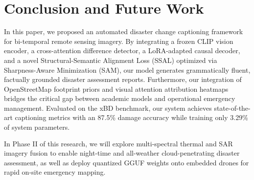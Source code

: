 \documentclass[conference]{IEEEtran}
\begin{document}
\section{Conclusion and Future Work}
In this paper, we proposed an automated disaster change captioning framework for bi-temporal remote sensing imagery. By integrating a frozen CLIP vision encoder, a cross-attention difference detector, a LoRA-adapted causal decoder, and a novel Structural-Semantic Alignment Loss (SSAL) optimized via Sharpness-Aware Minimization (SAM), our model generates grammatically fluent, factually grounded disaster assessment reports. Furthermore, our integration of OpenStreetMap footprint priors and visual attention attribution heatmaps bridges the critical gap between academic models and operational emergency management. Evaluated on the xBD benchmark, our system achieves state-of-the-art captioning metrics with an 87.5\% damage accuracy while training only 3.29\% of system parameters.

In Phase II of this research, we will explore multi-spectral thermal and SAR imagery fusion to enable night-time and all-weather cloud-penetrating disaster assessment, as well as deploy quantized GGUF weights onto embedded drones for rapid on-site emergency mapping.
\end{document}
